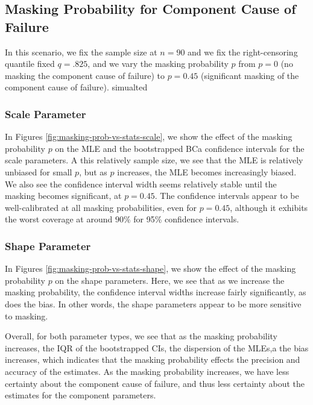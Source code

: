 \documentclass[
]{article}
\begin{document}
\hypertarget{sec:p-vs-mttf}{%
\subsection{Masking Probability for Component Cause of
Failure}\label{sec:p-vs-mttf}}

In this scenario, we fix the sample size at \(n = 90\) and we fix the
right-censoring quantile fixed \(q = .825\), and we vary the masking
probability \(p\) from \(p = 0\) (no masking the component cause of
failure) to \(p = 0.45\) (significant masking of the component cause of
failure). simualted

\hypertarget{scale-parameter}{%
\subsubsection*{Scale Parameter}\label{scale-parameter}}

In Figures \ref{fig:masking-prob-vs-stats-scale}, we show the effect of
the masking probability \(p\) on the MLE and the bootstrapped BCa
confidence intervals for the scale parameters. A this relatively sample
size, we see that the MLE is relatively unbiased for small \(p\), but as
\(p\) increases, the MLE becomes increasingly biased. We also see the
confidence interval width seems relatively stable until the masking
becomes significant, at \(p = 0.45\). The confidence intervals appear to
be well-calibrated at all masking probabilities, even for \(p = 0.45\),
although it exhibits the worst coverage at around \(90\%\) for 95\%
confidence intervals.

\hypertarget{shape-parameter}{%
\subsubsection*{Shape Parameter}\label{shape-parameter}}

In Figures \ref{fig:masking-prob-vs-stats-shape}, we show the effect of
the masking probability \(p\) on the shape parameters. Here, we see that
as we increase the masking probability, the confidence interval widths
increase fairly significantly, as does the bias. In other words, the
shape parameters appear to be more sensitive to masking.

Overall, for both parameter types, we see that as the masking
probability increases, the IQR of the bootstrapped CIs, the dispersion
of the MLEs,a the bias increases, which indicates that the masking
probability effects the precision and accuracy of the estimates. As the
masking probability increases, we have less certainty about the
component cause of failure, and thus less certainty about the estimates
for the component parameters.
\end{document}
